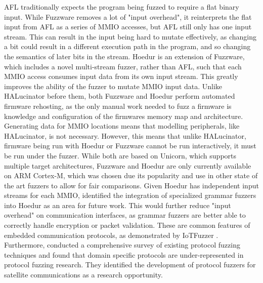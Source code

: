 \documentclass[../report.tex]{subfiles}
\begin{document}
AFL traditionally expects the program being fuzzed to require a flat binary input.
While Fuzzware removes a lot of "input overhead", it reinterprets the flat
input from AFL as a series of MMIO accesses, but AFL still only has one input
stream. This can result in the input being hard to mutate effectively, as
changing a bit could result in a different execution path in the program, and
so changing the semantics of later bits in the stream.
Hoedur \citep{Hoedur_2023} is an extension of Fuzzware, which includes a novel
multi-stream fuzzer, rather than AFL, such that each MMIO access consumes input
data from its own input stream. This greatly improves the ability of the fuzzer
to mutate MMIO input data. Unlike HALucinator before them, both Fuzzware and
Hoedur perform automated firmware rehosting, as the only manual work needed to
fuzz a firmware is knowledge and configuration of the firmwares memory map and
architecture. Generating data for MMIO locations means that modelling
peripherals, like HALucinator, is not necessary. However, this means that
unlike HALucinator, firmware being run with Hoedur or Fuzzware cannot be run
interactively, it must be run under the fuzzer. While both are based on
Unicorn, which supports multiple target architectures, Fuzzware and Hoedur are
only currently available on ARM Cortex-M, which was chosen due its popularity
and use in other state of the art fuzzers to allow for fair comparisons. Given
Hoedur has independent input streams for each MMIO, \citet{Hoedur_2023}
identified the integration of specialized grammar fuzzers into Hoedur as an
area for future work. This would further reduce "input overhead" on
communication interfaces, as grammar fuzzers are better able to correctly
handle encryption or packet validation. These are common features of embedded
communication protocols, as demonstrated by IoTFuzzer \citep{IOTFuzzer_2018}.
Furthermore, \citet{Zhang_2024} conducted a comprehensive survey of existing
protocol fuzzing techniques and found that domain specific protocols are
under-represented in protocol fuzzing research. They identified the development
of protocol fuzzers for satellite communications as a research opportunity.
\end{document}
